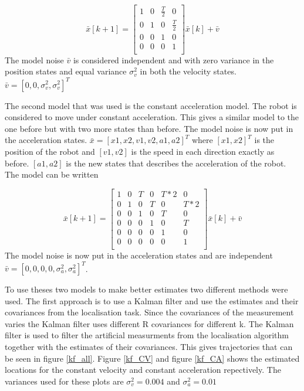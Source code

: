 \documentclass[10pt,a4paper]{report}
\begin{document}
\[
  \bar{x}[k+1] = 
  \begin{bmatrix}
    1 & 0 & \frac{T}{2} & 0 \\
    0 & 1 & 0 & \frac{T}{2} \\
    0 & 0 & 1 & 0 \\
    0 & 0 & 0 & 1 \\
  \end{bmatrix}
  \bar{x}[k] + \bar{v}
\]
The model noise $\bar{v}$ is considered independent and with zero variance in the position states and equal variance $\sigma_v^2$ in both the velocity states.
$\bar{v} = [0, 0, \sigma_v^2, \sigma_v^2]^T$

The second model that was used is the constant acceleration model.
The robot is considered to move under constant acceleration. This gives a similar model to the one before but with two more states than before.
The model noise is now put in the acceleration states.
$\bar{x} = [x1, x2, v1, v2, a1, a2]^T$ where $[x1, x2]^T$ is the position of the robot and $[v1, v2]$ is the speed in each direction exactly as before.
$[a1, a2]$ is the new states that describes the acceleration of the robot.
The model can be written

\[
  \bar{x}[k+1] = 
  \begin{bmatrix}
    1 & 0 & T & 0 & T*2 & 0\\
    0 & 1 & 0 & T & 0 & T*2\\
    0 & 0 & 1 & 0 & T & 0\\
    0 & 0 & 0 & 1 & 0 & T\\
    0 & 0 & 0 & 0 & 1 & 0\\
    0 & 0 & 0 & 0 & 0 & 1\\
  \end{bmatrix}
  \bar{x}[k] + \bar{v}
\]
The model noise is now put in the acceleration states and are independent $\bar{v} = [0, 0, 0, 0, \sigma_a^2, \sigma_a^2]^T$.

To use theses two models to make better estimates two different methods were used.
The first approach is to use a Kalman filter and use the estimates and their covariances from the localisation task.
Since the covariances of the measurement varies the Kalman filter uses different R covariances for different k.
The Kalman filter is used to filter the artificial measurments from the localisation algorithm together with the estimates of their covariances.
This gives trajectories that can be seen in figure \ref{kf_all}.
Figure \ref{kf_CV} and figure \ref{kf_CA} shows the estimated locations for the constant velocity and constant acceleration repectively.
The variances used for these plots are $\sigma_v^2 = 0.004$ and $\sigma_a^2 = 0.01$
\end{document}
